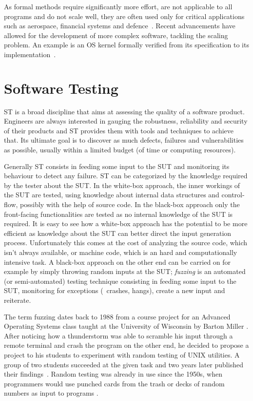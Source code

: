 As formal methods require significantly more effort, are not applicable to all
programs and do not scale well, they are often used only for critical
applications such as aerospace, financial systems and
defence~\cite{Woodcock2009FMP}. Recent advancements have allowed for the
development of more complex software, tackling the scaling problem. An example
is an \ac{OS} kernel formally verified from its specification to its
implementation~\cite{Klein2009SFV}.

\section{Software Testing}
\ac{ST} is a broad discipline that aims at assessing the quality of a
software product. Engineers are always interested in gauging the robustness,
reliability and security of their products and \ac{ST} provides them with tools
and techniques to achieve that. Its ultimate goal is to discover as much defects,
failures and vulnerabilities as possible, usually within a limited budget (of
time or computing resources).

Generally \ac{ST} consists in feeding some input to the \ac{SUT} and monitoring
its behaviour to detect any failure. \ac{ST} can be categorized by the knowledge
required by the tester about the \ac{SUT}. In the white-box approach, the inner
workings of the \ac{SUT} are tested, using knowledge about internal data
structures and control-flow, possibly with the help of source code. In the
black-box approach only the front-facing functionalities are tested as no
internal knowledge of the \ac{SUT} is required. It is easy to see how a
white-box approach has the potential to be more efficient as knowledge about the
\ac{SUT} can better direct the input generation process. Unfortunately this
comes at the cost of analyzing the source code, which isn't always available, or
machine code, which is an hard and computationally intensive task. A black-box
approach on the other end can be carried on for example by simply throwing
random inputs at the \ac{SUT}; \emph{fuzzing} is an automated (or
semi-automated) testing technique consisting in feeding some input to the
\ac{SUT}, monitoring for exceptions (\ie~crashes, hangs), create a new input and
reiterate.

The term fuzzing dates back to 1988 from a course project for an Advanced
Operating Systems class taught at the University of Wisconsin by Barton Miller
\cite{takanen2008fuzzing}. After noticing how a thunderstorm was able to
scramble his input through a remote terminal and crash the program on the other
end, he decided to propose a project to his students to experiment with random
testing of UNIX utilities. A group of two students succeeded at the given task
and two years later published their findings~\cite{miller1990empirical}. Random
testing was already in use since the 1950s, when programmers would use punched
cards from the trash or decks of random numbers as input to programs
\cite{weinberg2008}.

